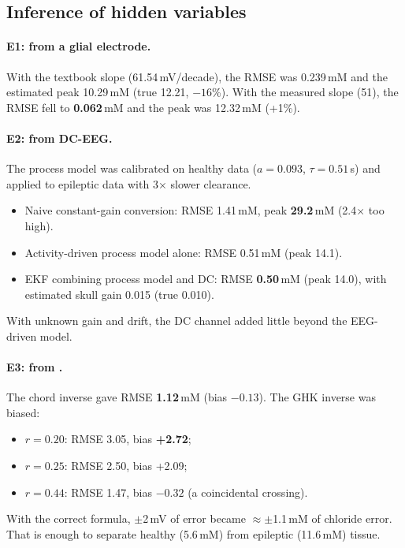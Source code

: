 \subsection{Inference of hidden variables}

\paragraph{E1: \Ko{} from a glial electrode.} With the textbook slope (61.54\,mV/decade), the RMSE was 0.239\,mM and the estimated peak 10.29\,mM (true 12.21, $-16$\%). With the measured slope (51), the RMSE fell to \textbf{0.062}\,mM and the peak was 12.32\,mM (+1\%).

\paragraph{E2: \Ko{} from DC-EEG.} The process model was calibrated on healthy data ($a=0.093$, $\tau=0.51$\,s) and applied to epileptic data with 3$\times$ slower clearance.
\begin{itemize}
\item Naive constant-gain conversion: RMSE 1.41\,mM, peak \textbf{29.2}\,mM (2.4$\times$ too high).
\item Activity-driven process model alone: RMSE 0.51\,mM (peak 14.1).
\item EKF combining process model and DC: RMSE \textbf{0.50}\,mM (peak 14.0), with estimated skull gain 0.015 (true 0.010).
\end{itemize}
With unknown gain and drift, the DC channel added little beyond the EEG-driven model.

\paragraph{E3: \Cli{} from \EGABA.} The chord inverse gave RMSE \textbf{1.12}\,mM (bias $-0.13$). The GHK inverse was biased:
\begin{itemize}
\item $r=0.20$: RMSE 3.05, bias \textbf{+2.72};
\item $r=0.25$: RMSE 2.50, bias +2.09;
\item $r=0.44$: RMSE 1.47, bias $-0.32$ (a coincidental crossing).
\end{itemize}
With the correct formula, $\pm$2\,mV of \EGABA{} error became $\approx\pm$1.1\,mM of chloride error. That is enough to separate healthy (5.6\,mM) from epileptic (11.6\,mM) tissue.


